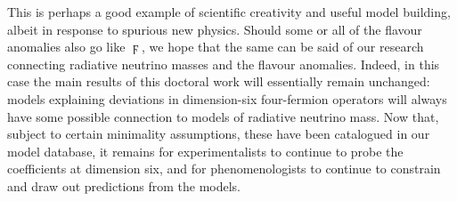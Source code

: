 This is perhaps a good example of scientific creativity and useful model
building, albeit in response to spurious new physics. Should some or all of the
flavour anomalies also go like $\digamma$, we hope that the same can be said of
our research connecting radiative neutrino masses and the flavour anomalies.
Indeed, in this case the main results of this doctoral work will essentially
remain unchanged: models explaining deviations in dimension-six four-fermion
operators will always have some possible connection to models of radiative
neutrino mass. Now that, subject to certain minimality assumptions, these have
been catalogued in our model database, it remains for experimentalists to
continue to probe the coefficients at dimension six, and for phenomenologists to
continue to constrain and draw out predictions from the models.
